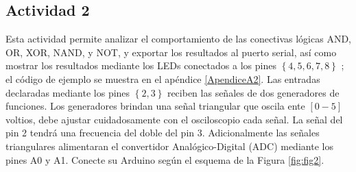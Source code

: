 \subsection{Actividad 2}

Esta actividad permite analizar el comportamiento de las conectivas lógicas  AND, OR, XOR, NAND, y NOT, y exportar los resultados al puerto serial, así como mostrar los resultados mediante los LEDs conectados a los pines $\left\lbrace4, 5, 6, 7, 8 \right\rbrace$ ; el código de ejemplo se muestra en el apéndice \ref{ApendiceA2}. 
Las entradas declaradas mediante los pines $\left\lbrace2, 3 \right\rbrace$ reciben las señales de dos generadores de funciones. 
Los generadores brindan una señal triangular que oscila ente $[0-5]$ voltios, debe ajustar cuidadosamente con el osciloscopio cada señal. 
La señal del pin 2 tendrá una frecuencia del doble del pin 3. Adicionalmente las señales  triangulares alimentaran el convertidor Analógico-Digital (ADC) mediante los pines A0 y A1. 
Conecte su Arduino según el esquema de la Figura \ref{fig:fig2}.  


